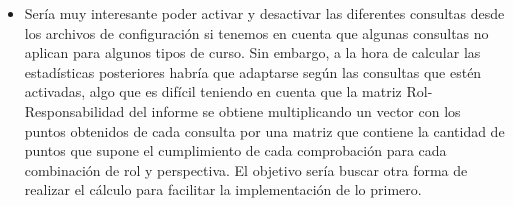 \begin{itemize}
	\item
	Sería muy interesante poder activar y desactivar las diferentes consultas desde los archivos de configuración si tenemos en cuenta que algunas consultas no aplican para algunos tipos de curso. Sin embargo, a la hora de calcular las estadísticas posteriores habría que adaptarse según las consultas que estén activadas, algo que es difícil teniendo en cuenta que la matriz Rol-Responsabilidad del informe se obtiene multiplicando un vector con los puntos obtenidos de cada consulta por una matriz que contiene la cantidad de puntos que supone el cumplimiento de cada comprobación para cada combinación de rol y perspectiva. El objetivo sería buscar otra forma de realizar el cálculo para facilitar la implementación de lo primero.
\end{itemize}
